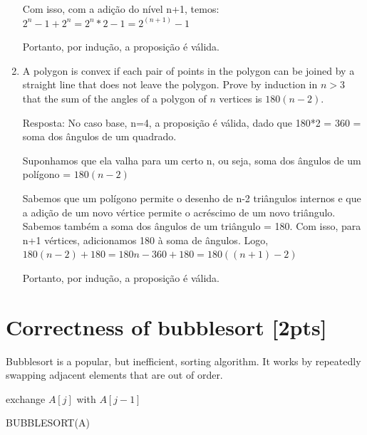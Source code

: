 \documentclass{article}
\begin{document}
\begin{enumerate}
  Com isso, com a adição do nível n+1, temos: $2^n-1 + 2^n = 2^n*2-1 = 2^{(n+1)}-1  $ 
  
  Portanto, por indução, a proposição é válida.
  
  \item A polygon is convex if each pair of points in the polygon can be joined by a straight line that does not leave the polygon. Prove by induction in $n>3$ that the sum of the angles of a polygon of $n$ vertices is $180(n-2)$.
  
  Resposta: No caso base, n=4, a proposição é válida, dado que 180*2 = 360 = soma dos ângulos de um quadrado.
  
  Suponhamos que ela valha para um certo n, ou seja, soma dos ângulos de um polígono = $180(n-2)$
  
  Sabemos que um polígono permite o desenho de n-2 triângulos internos e que a adição de um novo vértice permite o acréscimo de um novo triângulo. Sabemos também a soma dos ângulos de um triângulo = 180. Com isso, para n+1 vértices, adicionamos 180 à soma de ângulos. Logo, $180(n-2) + 180 = 180n - 360 + 180 = 180((n+1)-2)$
  
  Portanto, por indução, a proposição é válida.
  
\end{enumerate}

\section{Correctness of bubblesort [2pts]}
Bubblesort is a popular, but inefficient, sorting algorithm. It works by repeatedly swapping adjacent elements that are out of order.

\begin{algorithm}[H]
\SetAlgoLined
   {
     {
       {
        exchange $A[j]$ with $A[j-1]$
      }
    }
  }
\caption{BUBBLESORT(A)}
\end{algorithm}
\end{document}

